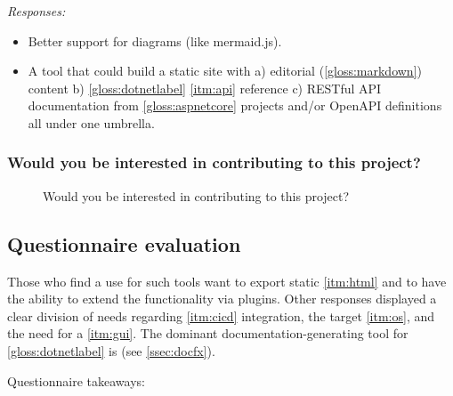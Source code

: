\textit{Responses:}
\begin{itemize}
    \item Better support for diagrams (like mermaid.js).
    \item A tool that could build a static site with a) editorial (\ref{gloss:markdown}) content b) \ref{gloss:dotnetlabel} \ref{itm:api} reference c) RESTful API documentation from \ref{gloss:aspnetcore} projects and/or OpenAPI definitions all under one umbrella.
\end{itemize}

\subsubsection*{Would you be interested in contributing to this project?}

\begin{figure}[H]
    \centering
    \caption{Would you be interested in contributing to this project?}
\end{figure}

\subsection{Questionnaire evaluation} \label{ssec:questionnaireeval}

Those who find a use for such tools want to export static \ref{itm:html} and to have the ability to extend the functionality via plugins.
Other responses displayed a clear division of needs regarding \ref{itm:cicd} integration, the target \ref{itm:os}, and the need for a \ref{itm:gui}.
The dominant documentation-generating tool for \ref{gloss:dotnetlabel} is  (see \ref{ssec:docfx}).

Questionnaire takeaways:

